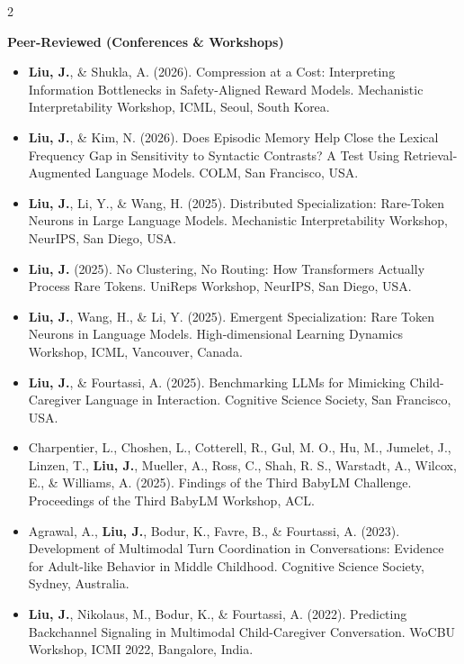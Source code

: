 \documentclass[10pt,A4]{article}
\begin{document}
\begin{paracol}{2}
\begin{rightcolumn}
\textbf{\textcolor{darkcol}{Peer-Reviewed (Conferences \& Workshops)}}
\begin{itemize}
	\item \textbf{Liu, J.}, \& Shukla, A. (2026). Compression at a Cost: Interpreting Information Bottlenecks in Safety-Aligned Reward Models. Mechanistic Interpretability Workshop, ICML, Seoul, South Korea.
	\item \textbf{Liu, J.}, \& Kim, N. (2026). Does Episodic Memory Help Close the Lexical Frequency Gap in Sensitivity to Syntactic Contrasts? A Test Using Retrieval-Augmented Language Models. COLM, San Francisco, USA.
	\item \textbf{Liu, J.}, Li, Y., \& Wang, H. (2025). Distributed Specialization: Rare-Token Neurons in Large Language Models. Mechanistic Interpretability Workshop, NeurIPS, San Diego, USA.
	\item \textbf{Liu, J.} (2025). No Clustering, No Routing: How Transformers Actually Process Rare Tokens. UniReps Workshop, NeurIPS, San Diego, USA.
	\item \textbf{Liu, J.}, Wang, H., \& Li, Y. (2025). Emergent Specialization: Rare Token Neurons in Language Models. High-dimensional Learning Dynamics Workshop, ICML, Vancouver, Canada.
	\item \textbf{Liu, J.}, \& Fourtassi, A. (2025). Benchmarking LLMs for Mimicking Child-Caregiver Language in Interaction. Cognitive Science Society, San Francisco, USA.
	\item Charpentier, L., Choshen, L., Cotterell, R., Gul, M. O., Hu, M., Jumelet, J., Linzen, T., \textbf{Liu, J.}, Mueller, A., Ross, C., Shah, R. S., Warstadt, A., Wilcox, E., \& Williams, A. (2025). Findings of the Third BabyLM Challenge. Proceedings of the Third BabyLM Workshop, ACL.
	\item Agrawal, A., \textbf{Liu, J.}, Bodur, K., Favre, B., \& Fourtassi, A. (2023). Development of Multimodal Turn Coordination in Conversations: Evidence for Adult-like Behavior in Middle Childhood. Cognitive Science Society, Sydney, Australia.
	\item \textbf{Liu, J.}, Nikolaus, M., Bodur, K., \& Fourtassi, A. (2022). Predicting Backchannel Signaling in Multimodal Child-Caregiver Conversation. WoCBU Workshop, ICMI 2022, Bangalore, India.
\end{itemize}


\end{rightcolumn}
\end{paracol}
\end{document}

